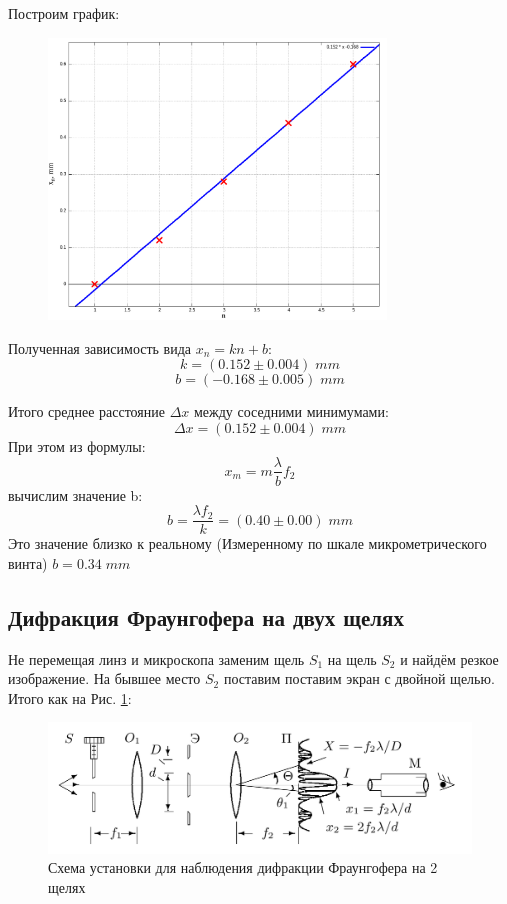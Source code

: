 \documentclass{article}
\begin{document}
Построим график:
\begin{figure}[H]
  \centering
  \includegraphics[width=0.8\textwidth]{fgfr.png}
\end{figure}
Полученная зависимость вида \(x_n = kn + b\):
\[ k = (0.152 \pm 0.004)\;mm \]
\[ b = (-0.168 \pm 0.005)\;mm \]

Итого среднее расстояние \(\Delta x\) между соседними минимумами:
\[ \Delta x = (0.152 \pm 0.004)\; mm \]
При этом из формулы:
\[ x_m = m \frac{\lambda}{b}f_2 \]
вычислим значение b:
\[ b = \frac{\lambda f_2}{k} = (0.40 \pm 0.00)\;mm\]
Это значение близко к реальному (Измеренному по шкале микрометрического винта) \(b = 0.34\;mm\)

\subsection{Дифракция Фраунгофера на двух щелях}
Не перемещая линз и микроскопа заменим щель \(S_1\) на щель \(S_2\) и найдём резкое изображение.
На бывшее место \(S_2\) поставим поставим экран с двойной щелью. Итого как на Рис. \ref{fig:fgfr2}:
\begin{figure}[H]
  \centering
  \includegraphics[width=\textwidth]{fgfr-scheme-2.png}
  \caption{Схема установки для наблюдения дифракции Фраунгофера на 2 щелях}
  \label{fig:fgfr2}
\end{figure}
\end{document}
